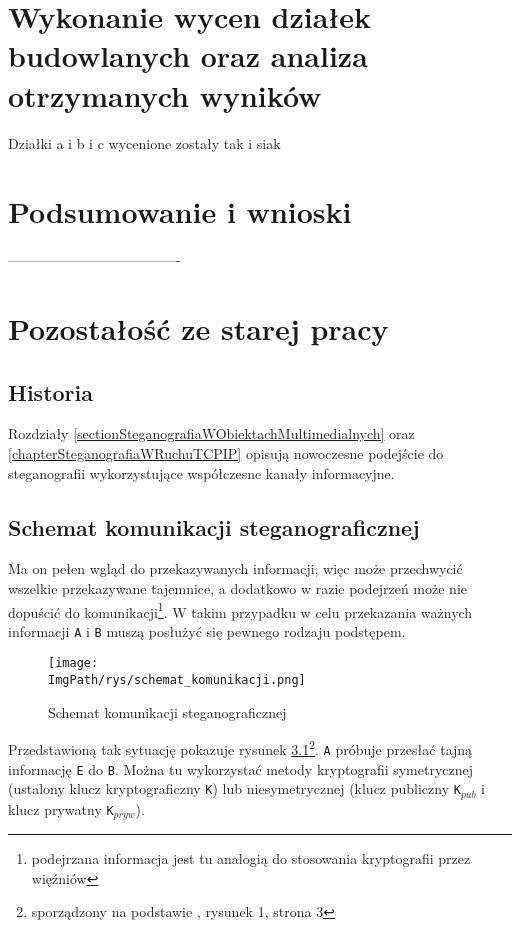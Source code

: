 \documentclass[a4paper,12pt,twoside,openany]{report}
\newcommand{\ImgPath}{.}
\newcommand{\tech}{\texttt}
\begin{document}
\chapter{Wykonanie wycen działek budowlanych oraz analiza otrzymanych wyników}
Działki a i b i c wycenione zostały tak i siak
\chapter{Podsumowanie i wnioski}

-------------------------------------
\chapter{Pozostałość ze starej pracy}

\section{Historia}

Rozdziały \ref{sectionSteganografiaWObiektachMultimedialnych} oraz 
\ref{chapterSteganografiaWRuchuTCPIP} opisują nowoczesne podejście do 
steganografii wykorzystujące współczesne kanały informacyjne. 
\section{Schemat komunikacji steganograficznej}
\label{sectionSchematKomunikacjiSteganograficznej}
 Ma on pełen wgląd do przekazywanych 
informacji, więc może przechwycić wszelkie przekazywane tajemnice, a dodatkowo w 
razie podejrzeń może nie dopuścić do komunikacji\footnote{podejrzana informacja 
jest tu analogią do stosowania kryptografii przez więźniów}. W takim przypadku w 
celu przekazania ważnych informacji \tech{A} i \tech{B} muszą posłużyć się 
pewnego rodzaju podstępem. 
\begin{figure}[!htbp]
	\begin{center}
\centering
\texttt{[image: \\ImgPath/rys/schemat\_komunikacji.png]}
\end{center}
	\caption{Schemat komunikacji steganograficznej}
	\label{schematKomunikacji}
\end{figure}

Przedstawioną tak sytuację pokazuje rysunek 
\ref{schematKomunikacji}\footnote{sporządzony na podstawie 
\cite{schematKomunikacjiPrzypis}, rysunek 1, strona 3}. \tech{A} próbuje 
przesłać tajną informację \tech{E} do \tech{B}. Można tu wykorzystać metody kryptografii symetrycznej (ustalony 
klucz kryptograficzny \tech{K}) lub niesymetrycznej (klucz publiczny 
\tech{K}$_{pub}$ i klucz prywatny \tech{K}$_{pryw}$).
\end{document}
